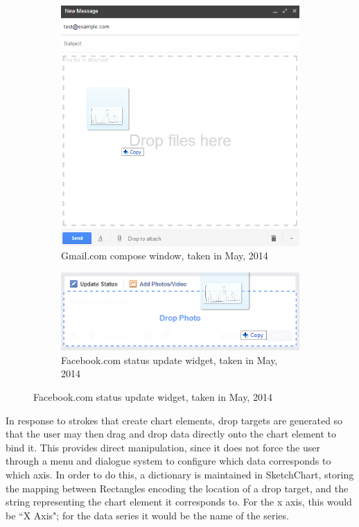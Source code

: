 	\begin{figure}[h]
		\centering
		\begin{subfigure}[b]{0.4\textwidth}
			\includegraphics[width=\textwidth]{dropexample1}
			\caption{Gmail.com compose window, taken in May, 2014}
			\label{fig:dropexample1}
		\end{subfigure}
		\begin{subfigure}[b]{0.4\textwidth}
			\includegraphics[width=\textwidth]{dropexample2}
			\caption{Facebook.com status update widget, taken in May, 2014}
			\label{fig:dropexample2}
		\end{subfigure}

	\end{figure}
	
	In response to strokes that create chart elements, drop targets are generated so that the user may then drag and drop data directly onto the chart element to bind it. This provides direct manipulation, since it does not force the user through a menu and dialogue system to configure which data corresponds to which axis. In order to do this, a dictionary is maintained in SketchChart, storing the mapping between Rectangles encoding the location of a drop target, and the string representing the chart element it corresponds to. For the x axis, this would be ``X Axis"; for the data series it would be the name of the series. 
	
